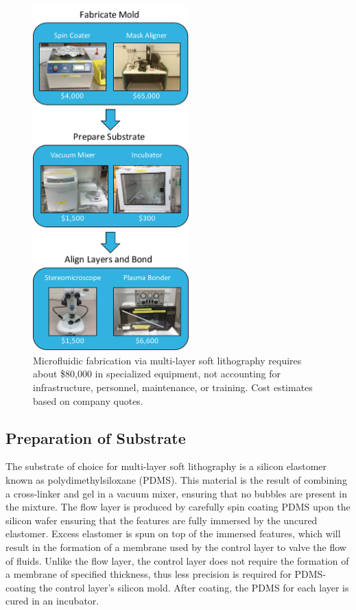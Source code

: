 \begin{figure}[h]
  \begin{minipage}[t]{0.99\linewidth}\centering
    \includegraphics[width=6cm]{equipSoftLith.pdf}
    \medskip
  \end{minipage}\hfill
  \caption[Specialized equipment required to performform soft lithography]{Microfluidic fabrication via multi-layer soft lithography requires about \$80,000 in specialized equipment, not accounting for infrastructure, personnel, maintenance, or training. Cost estimates based on company quotes.}
    \label{fig:equipSoftLith}
\end{figure}


\subsection{Preparation of Substrate}
The substrate of choice for multi-layer soft lithography is a silicon elastomer known as polydimethylsiloxane (PDMS). This material is the result of combining a cross-linker and gel in a vacuum mixer, ensuring that no bubbles are present in the mixture. The flow layer is produced by carefully spin coating PDMS upon the silicon wafer ensuring that the features are fully immersed by the uncured elastomer. Excess elastomer is spun on top of the immersed features, which will result in the formation of a membrane used by the control layer to valve the flow of fluids. Unlike the flow layer, the control layer does not require the formation of a membrane of specified thickness, thus less precision is required for PDMS-coating the control layer's silicon mold. After coating, the PDMS for each layer is cured in an incubator.


